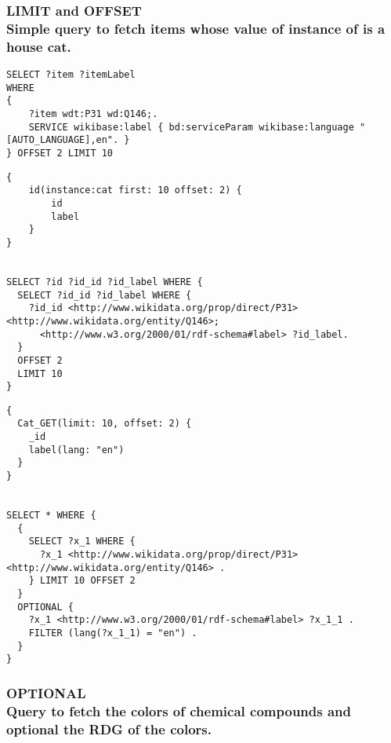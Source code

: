 \subsubsection{LIMIT and OFFSET \\Simple query to fetch items whose value of instance of is a house cat.}

\begin{minipage}{\linewidth}
\begin{lstlisting}[label=listing:listing34, caption={Query 1}]
SELECT ?item ?itemLabel
WHERE
{
    ?item wdt:P31 wd:Q146;.
    SERVICE wikibase:label { bd:serviceParam wikibase:language "[AUTO_LANGUAGE],en". }
} OFFSET 2 LIMIT 10
\end{lstlisting}
\end{minipage}


\begin{minipage}{\linewidth}
\begin{lstlisting}[label=listing:listing35, caption={Query 1 - GraphQL-LD}]
{
    id(instance:cat first: 10 offset: 2) {
        id
        label
    }
}


SELECT ?id ?id_id ?id_label WHERE {
  SELECT ?id_id ?id_label WHERE {
    ?id_id <http://www.wikidata.org/prop/direct/P31> <http://www.wikidata.org/entity/Q146>;
      <http://www.w3.org/2000/01/rdf-schema#label> ?id_label.
  }
  OFFSET 2
  LIMIT 10
}
\end{lstlisting}
\end{minipage}




\begin{minipage}{\linewidth}
\begin{lstlisting}[label=listing:listing36, caption={Query 1 - HypergraphQL}]
{
  Cat_GET(limit: 10, offset: 2) {
    _id
    label(lang: "en")
  }
}


SELECT * WHERE {
  {
    SELECT ?x_1 WHERE {
      ?x_1 <http://www.wikidata.org/prop/direct/P31> <http://www.wikidata.org/entity/Q146> .
    } LIMIT 10 OFFSET 2
  }
  OPTIONAL {
    ?x_1 <http://www.w3.org/2000/01/rdf-schema#label> ?x_1_1 .
    FILTER (lang(?x_1_1) = "en") .
  }
}
\end{lstlisting}
\end{minipage}


\subsubsection{OPTIONAL \\Query to fetch the colors of chemical compounds and optional the RDG of the colors.}

